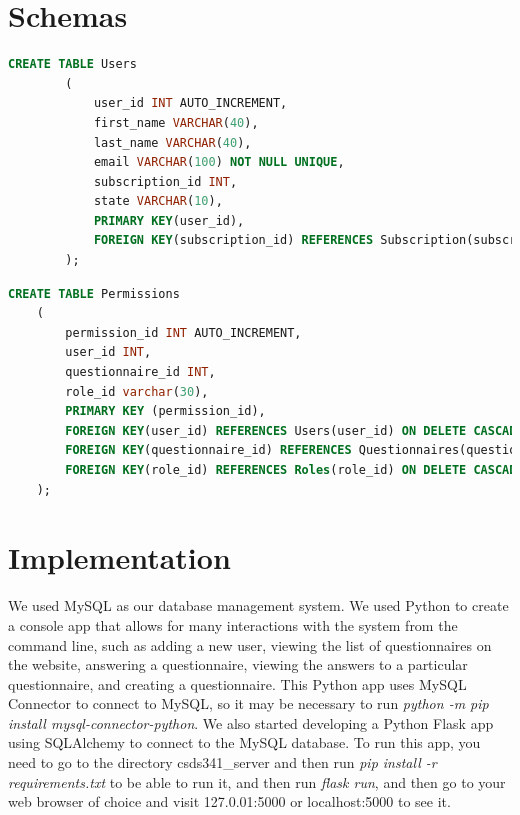 \documentclass[12pt, oneside, a4paper]{article}
\begin{document}
    \section{Schemas}
    \begin{lstlisting}[language=SQL, columns=flexible, breaklines]
        CREATE TABLE Users
        (
            user_id INT AUTO_INCREMENT,
            first_name VARCHAR(40),
            last_name VARCHAR(40),
            email VARCHAR(100) NOT NULL UNIQUE,
            subscription_id INT,
            state VARCHAR(10),
            PRIMARY KEY(user_id),
            FOREIGN KEY(subscription_id) REFERENCES Subscription(subscription_id) ON DELETE CASCADE
        );
    \end{lstlisting}
    \begin{lstlisting}[language=SQL, columns=flexible, breaklines]
    CREATE TABLE Permissions
    (
        permission_id INT AUTO_INCREMENT,
        user_id INT,
        questionnaire_id INT,
        role_id varchar(30),
        PRIMARY KEY (permission_id),
        FOREIGN KEY(user_id) REFERENCES Users(user_id) ON DELETE CASCADE,
        FOREIGN KEY(questionnaire_id) REFERENCES Questionnaires(questionnaire_id) ON DELETE CASCADE,
        FOREIGN KEY(role_id) REFERENCES Roles(role_id) ON DELETE CASCADE
    );
    \end{lstlisting}
    \section{Implementation}
    We used MySQL as our database management system. We used Python to create a console app that allows for many interactions with the system from the command line, such as adding a new user, viewing the list of questionnaires on the website, answering a questionnaire, viewing the answers to a particular questionnaire, and creating a questionnaire. This Python app uses MySQL Connector to connect to MySQL, so it may be necessary to run \emph{python -m pip install mysql-connector-python}. We also started developing a Python Flask app using SQLAlchemy to connect to the MySQL database. To run this app, you need to go to the directory csds341\_server and then run \emph{pip install -r requirements.txt} to be able to run it, and then run \emph{flask run}, and then go to your web browser of choice and visit 127.0.01:5000 or localhost:5000 to see it.
\end{document}
